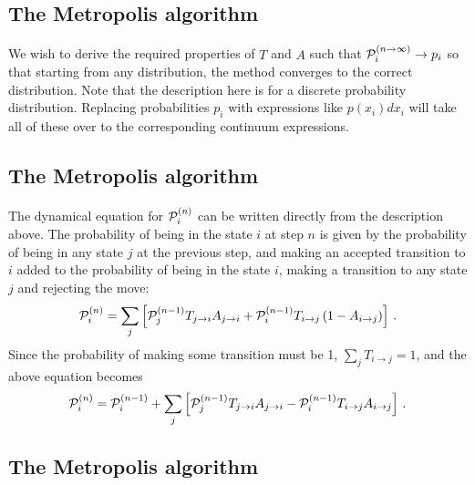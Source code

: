 \documentclass[%
twoside,                 %
final,                   %
10pt]{article}
\begin{document}
\noindent




\subsection*{The Metropolis algorithm}

\paragraph{}
We wish to derive the required properties of $T$ and $A$ such that
${\cal P}_i^{(n\rightarrow \infty)} \rightarrow p_i$ so that starting
from any distribution, the method converges to the correct distribution.
Note that the description here is for a discrete probability distribution.
Replacing probabilities $p_i$ with expressions like $p(x_i)dx_i$ will
take all of these over to the corresponding continuum expressions.




\subsection*{The Metropolis algorithm}

\paragraph{}
The dynamical equation for ${\cal P}_i^{(n)}$ can be written directly from
the description above. The probability of being in the state $i$ at step $n$
is given by the probability of being in any state $j$ at the previous step,
and making an accepted transition to $i$ added to the probability of
being in the state $i$, making a transition to any state $j$ and
rejecting the move:
\[
{\cal P}^{(n)}_i = \sum_j \left [
{\cal P}^{(n-1)}_jT_{j\rightarrow i} A_{j\rightarrow i} 
+{\cal P}^{(n-1)}_iT_{i\rightarrow j}\left ( 1- A_{i\rightarrow j} \right)
\right ] \,.
\]
Since the probability of making some transition must be 1,
$\sum_j T_{i\rightarrow j} = 1$, and the above equation becomes
\[
{\cal P}^{(n)}_i = {\cal P}^{(n-1)}_i +
 \sum_j \left [
{\cal P}^{(n-1)}_jT_{j\rightarrow i} A_{j\rightarrow i} 
-{\cal P}^{(n-1)}_iT_{i\rightarrow j}A_{i\rightarrow j}
\right ] \,.
\]




\subsection*{The Metropolis algorithm}
\end{document}
